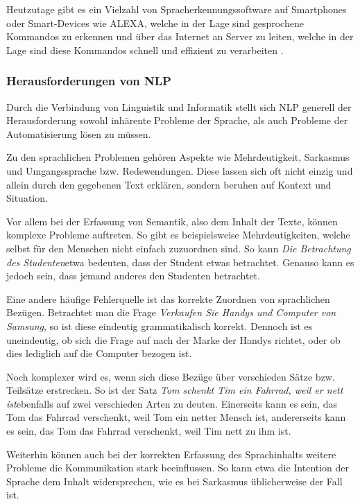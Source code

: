 \documentclass[12pt]{report}
\begin{document}
Heutzutage gibt es ein Vielzahl von Spracherkennungssoftware auf Smartphones oder Smart-Devices wie ALEXA, welche in der Lage sind gesprochene Kommandos zu erkennen und über das Internet an Server zu leiten, welche in der Lage sind diese Kommandos schnell und effizient zu verarbeiten \cite{hao14}.

\subsubsection{Herausforderungen von NLP}
Durch die Verbindung von Linguistik und Informatik stellt sich NLP generell der Herausforderung sowohl inhärente Probleme der Sprache, als auch Probleme der Automatisierung lösen zu müssen. 

Zu den sprachlichen Problemen gehören Aspekte wie Mehrdeutigkeit, Sarkasmus und Umgangssprache bzw. Redewendungen. Diese lassen sich oft nicht einzig und allein durch den gegebenen Text erklären, sondern beruhen auf Kontext und Situation.

Vor allem bei der Erfassung von Semantik, also dem Inhalt der Texte, können komplexe Probleme auftreten. So gibt es beispielsweise Mehrdeutigkeiten, welche selbst für den Menschen nicht einfach zuzuordnen sind. So kann \glqq \textit{Die Betrachtung des Studenten}\grqq etwa bedeuten, dass der Student etwas betrachtet. Genauso kann es jedoch sein, dass jemand anderes den Studenten betrachtet. 

Eine andere häufige Fehlerquelle ist das korrekte Zuordnen von sprachlichen Bezügen. Betrachtet man die Frage \glqq \textit{Verkaufen Sie Handys und Computer von Samsung}\grqq, so ist diese eindeutig grammatikalisch korrekt. Dennoch ist es uneindeutig, ob sich die Frage auf nach der Marke der Handys richtet, oder ob dies lediglich auf die Computer bezogen ist. 

Noch komplexer wird es, wenn sich diese Bezüge über verschieden Sätze bzw. Teilsätze erstrecken. So ist der Satz \glqq \textit{Tom schenkt Tim ein Fahrrad, weil er nett ist}\grqq ebenfalls auf zwei verschieden Arten zu deuten. Einerseits kann es sein, das Tom das Fahrrad verschenkt, weil Tom ein netter Mensch ist, andererseits kann es sein, das Tom das Fahrrad verschenkt, weil Tim nett zu ihm ist. 

Weiterhin können auch bei der korrekten Erfassung des Sprachinhalts weitere Probleme die Kommunikation stark beeinflussen. So kann etwa die Intention der Sprache dem Inhalt widersprechen, wie es bei Sarkasmus üblicherweise der Fall ist. 
\end{document}
